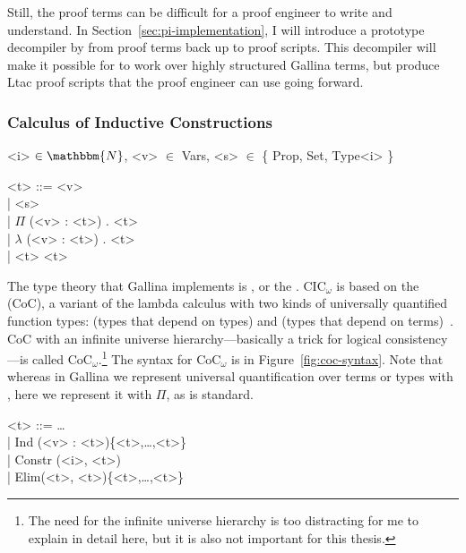 Still, the proof terms can be difficult for a proof engineer to write and understand.
In Section~\ref{sec:pi-implementation}, I will introduce a prototype decompiler by  from proof terms back up to proof scripts.
This decompiler will make it possible for \sysnamelong to work over highly structured Gallina terms,
but produce Ltac proof scripts that the proof engineer can use going forward.

\subsubsection{Calculus of Inductive Constructions}
\label{sec:cic}

\begin{figure*}
\small
\begin{grammar}
<i> $\in \mathbbm{N}$, <v> $\in$ Vars, <s> $\in$ \{ Prop, Set, Type<i> \}

<t> ::= <v>\\
| <s> \\
| $\Pi$ (<v> : <t>) . <t>\\
| $\lambda$ (<v> : <t>) . <t>\\
|  <t> <t>
\end{grammar}
\caption{Syntax for CoC$_\omega$ with (from top to bottom) variables, sorts, function types, functions, and application.}
\label{fig:coc-syntax}
\end{figure*}

The type theory that Gallina implements is , or the .
CIC$_{\omega}$ is based on the  (CoC), a variant of the lambda calculus with two kinds of universally quantified function types:  (types that depend on types) and  (types that depend on terms)~\cite{coquand:inria-00076024}.
CoC with an infinite universe hierarchy---basically a trick for logical consistency---is 
called CoC$_{\omega}$.\footnote{The need for the infinite universe hierarchy is too distracting for me to explain in detail here, but it is also not important for this thesis.}
The syntax for CoC$_{\omega}$ is in Figure~\ref{fig:coc-syntax}.
Note that whereas in Gallina we represent universal quantification over terms or types with \ltacforall, here we represent it with $\Pi$, as is standard.

\begin{figure*}
\small
\begin{grammar}
<t> ::= \ldots\\
| Ind (<v> : <t>)\{<t>,\ldots,<t>\} \\
| Constr (<i>, <t>)\\
| Elim(<t>, <t>)\{<t>,\ldots,<t>\}
\end{grammar}
\caption{CIC$_\omega$ is CoC$_\omega$ with , inductive , and .}
\label{fig:cic-syntax}
\end{figure*}

